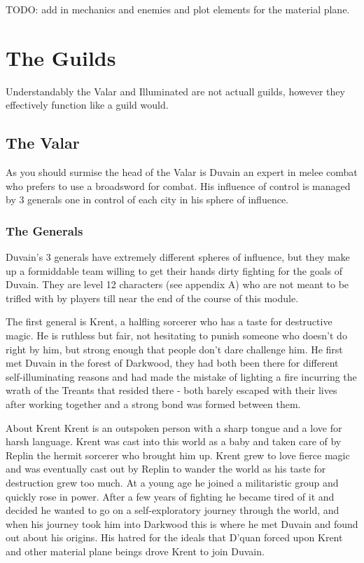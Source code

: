 \documentclass[10pt,twoside,twocolumn]{article}
\begin{document}
TODO: add in mechanics and enemies and plot elements for the material plane.

\section{The Guilds}
Understandably the Valar and Illuminated are not actuall guilds, however they effectively function like a guild would.

\subsection{The Valar}
As you should surmise the head of the Valar is Duvain an expert in melee combat who prefers to use a broadsword for combat. His influence of control is managed by 3 generals one in control of each city in his sphere of influence.

\subsubsection{The Generals}
Duvain's 3 generals have extremely different spheres of influence, but they make up a formiddable team willing to get their hands dirty fighting for the goals of Duvain. They are level 12 characters (see appendix A) who are not meant to be trifled with by players till near the end of the course of this module.

The first general is Krent, a halfling sorcerer who has a taste for destructive magic. He is ruthless but fair, not hesitating to punish someone who doesn't do right by him, but strong enough that people don't dare challenge him. He first met Duvain in the forest of Darkwood, they had both been there for different self-illuminating reasons and had made the mistake of lighting a fire incurring the wrath of the Treants that resided there - both barely escaped with their lives after working together and a strong bond was formed between them.

\begin{commentbox}{About Krent}
Krent is an outspoken person with a sharp tongue and a love for harsh language. Krent was cast into this world as a baby and taken care of by Replin the hermit sorcerer who brought him up. Krent grew to love fierce magic and was eventually cast out by Replin to wander the world as his taste for destruction grew too much. At a young age he joined a militaristic group and quickly rose in power. After a few years of fighting he became tired of it and decided he wanted to go on a self-exploratory journey through the world, and when his journey took him into Darkwood this is where he met Duvain and found out about his origins. His hatred for the ideals that D'quan forced upon Krent and other material plane beings drove Krent to join Duvain.
\end{commentbox}
\end{document}
